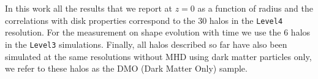 \documentclass[a4paper,fleqn,usenatbib]{mnras}
\begin{document}
In this work all the results that we report at $z=0$ as a function of radius and
the correlations with disk properties correspond to the 30 halos in
the \texttt{Level4} resolution. 
For the measurement on shape evolution with time we use the 6 halos in
the \texttt{Level3} simulations.
Finally, all  halos described so far have also been simulated at the same
resolutions without MHD using dark matter particles only, we refer to
these halos as the DMO (Dark Matter Only) sample.



\begin{figure}
  \centering
  \hfill
  \hfill 


\end{figure}
\end{document}
